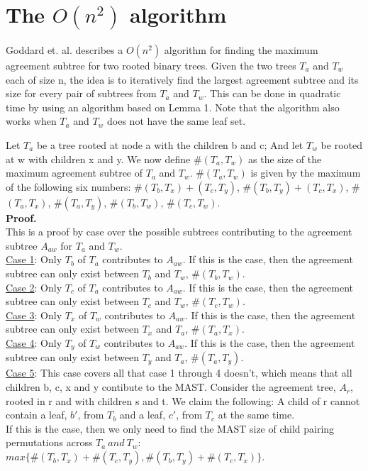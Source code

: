 \chapter{The $O(n^2)$ algorithm}
Goddard et. al.\cite{nsquared} describes a $O(n^2)$ algorithm for finding the maximum agreement subtree for two rooted binary trees. Given the two trees $T_a$ and $T_w$ each of size n, the idea is to iteratively find the largest agreement subtree and its size for every pair of subtrees from $T_a$ and $T_w$. This can be done in quadratic time by using an algorithm based on Lemma 1. Note that the algorithm also works when $T_a$ and $T_w$ does not have the same leaf set.

\begin{Lemma}
	Let $T_a$ be a tree rooted at node a with the children b and c; And let $T_w$ be rooted at w with children x and y. We now define $\#(T_a,T_w)$ as the size of the maximum agreement subtree of $T_a$ and $T_w$.  $\#(T_a,T_w)$ is given by the maximum of the following six numbers: \#$(T_b,T_x)+(T_c,T_y)$,
	\#$(T_b,T_y)+(T_c,T_x)$,
	\#$(T_a,T_x)$,
	\#$(T_a,T_y)$,
	\#$(T_b,T_w)$,
	\#$(T_c,T_w)$.\\
	\textbf{Proof.}\\
	This is a proof by case over the possible subtrees contributing to the agreement subtree $A_{aw}$ for $T_a$ and $T_w$.\\
	\underline{Case 1}: Only $T_b$ of $T_a$ contributes to $A_{aw}$.
	If this is the case, then the agreement subtree can only exist between $T_b$ and $T_w$, \#$(T_b,T_w)$.\\
	\underline{Case 2}: Only $T_c$ of $T_a$ contributes to $A_{aw}$.
	If this is the case, then the agreement subtree can only exist between $T_c$ and $T_w$,
	\#$(T_c,T_w)$.\\
	\underline{Case 3}: Only $T_x$ of $T_w$ contributes to $A_{aw}$.
	If this is the case, then the agreement subtree can only exist between $T_x$ and $T_a$,
	\#$(T_a,T_x)$.\\
	\underline{Case 4}: Only $T_y$ of $T_w$ contributes to $A_{aw}$.
	If this is the case, then the agreement subtree can only exist between $T_y$ and $T_a$,
	\#$(T_a,T_y)$.\\
	\underline{Case 5}: This case covers all that case 1 through 4 doesn't, which means that all children b, c, x and y contibute to the MAST.
	Consider the agreement tree, $A_r$, rooted in r and with children s and t. We claim the following: A child of r cannot contain a leaf, $b'$, from $T_b$ and a leaf, $c'$, from $T_c$ at the same time.\\
	If this is the case, then we only need to find the MAST size of child pairing permutations across $T_a\ and\ T_w$: $max\{\#(T_b, T_x)+\#(T_c, T_y), \#(T_b, T_y)+\#(T_c, T_x)\}$.
	

\end{Lemma}
